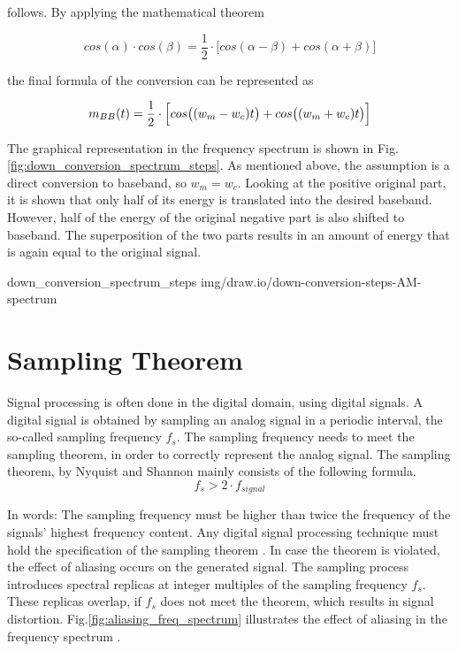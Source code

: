 follows.
By applying the mathematical theorem

\begin{equation}
  cos(\alpha) \cdot cos(\beta) = \frac{1}{2} \cdot \bigl[ cos(\alpha-\beta) + cos(\alpha+\beta) \bigr]
\end{equation}

the final formula of the conversion can be represented as

\begin{equation}
 m_{BB}(t) = \frac{1}{2} \cdot \Bigl[ cos\bigl((w_m-w_c)t\bigr) + cos\bigl((w_m+w_c)t\bigr) \Bigr]
\end{equation}

The graphical representation in the frequency spectrum is shown in Fig.\ref{fig:down_conversion_spectrum_steps}.
As mentioned above, the assumption is a direct conversion to baseband, so $w_m = w_c$.
Looking at the positive original part, it is shown that only half of its energy is translated into the desired baseband.
However, half of the energy of the original negative part is also shifted to baseband.
The superposition of the two parts results in an amount of energy that is again equal to the original signal.

 {down_conversion_spectrum_steps} {img/draw.io/down-conversion-steps-AM-spectrum}

\section{Sampling Theorem}
\label{sec:SamplingTheorem}

Signal processing is often done in the digital domain, using digital signals.
A digital signal is obtained by sampling an analog signal in a periodic interval, the so-called sampling frequency $f_s$.
The sampling frequency needs to meet the sampling theorem, in order to correctly represent the analog signal.
The sampling theorem, by Nyquist and Shannon mainly consists of the following formula.
\begin{equation}
  f_{s} > 2 \cdot f_{signal}
\end{equation}

In words: The sampling frequency must be higher than twice the frequency of the signals' highest frequency content.
Any digital signal processing technique must hold the specification of the sampling theorem \cite[chpt. 4.2]{AlessioSilviaMaria2016DSPa}.
In case the theorem is violated, the effect of aliasing occurs on the generated signal.
The sampling process introduces spectral replicas at integer multiples of the sampling frequency $f_s$.
These replicas overlap, if $f_s$ does not meet the theorem, which results in signal distortion.
Fig.\ref{fig:aliasing_freq_spectrum} illustrates the effect of aliasing in the frequency spectrum \cite{ThyagarajanK.S2019ItDS}.

